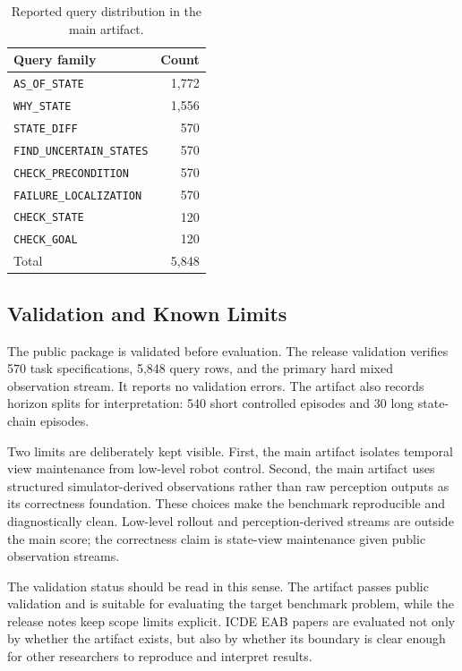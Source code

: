 \documentclass[conference]{IEEEtran}
\begin{document}
\begin{table}[!t]
\caption{Reported query distribution in the main artifact.}
\label{tab:query-distribution}
\centering
\footnotesize
\begin{tabular}{@{}lr@{}}
\toprule
Query family & Count \\
\midrule
\texttt{AS\_OF\_STATE} & 1,772 \\
\texttt{WHY\_STATE} & 1,556 \\
\texttt{STATE\_DIFF} & 570 \\
\texttt{FIND\_UNCERTAIN\_STATES} & 570 \\
\texttt{CHECK\_PRECONDITION} & 570 \\
\texttt{FAILURE\_LOCALIZATION} & 570 \\
\texttt{CHECK\_STATE} & 120 \\
\texttt{CHECK\_GOAL} & 120 \\
\midrule
Total & 5,848 \\
\bottomrule
\end{tabular}
\end{table}

\subsection{Validation and Known Limits}

The public package is validated before evaluation. The release validation verifies 570 task specifications, 5,848 query rows, and the primary hard mixed observation stream. It reports no validation errors. The artifact also records horizon splits for interpretation: 540 short controlled episodes and 30 long state-chain episodes.

Two limits are deliberately kept visible. First, the main artifact isolates temporal view maintenance from low-level robot control. Second, the main artifact uses structured simulator-derived observations rather than raw perception outputs as its correctness foundation. These choices make the benchmark reproducible and diagnostically clean. Low-level rollout and perception-derived streams are outside the main score; the correctness claim is state-view maintenance given public observation streams.

The validation status should be read in this sense. The artifact passes public validation and is suitable for evaluating the target benchmark problem, while the release notes keep scope limits explicit. ICDE EAB papers are evaluated not only by whether the artifact exists, but also by whether its boundary is clear enough for other researchers to reproduce and interpret results.
\end{document}
